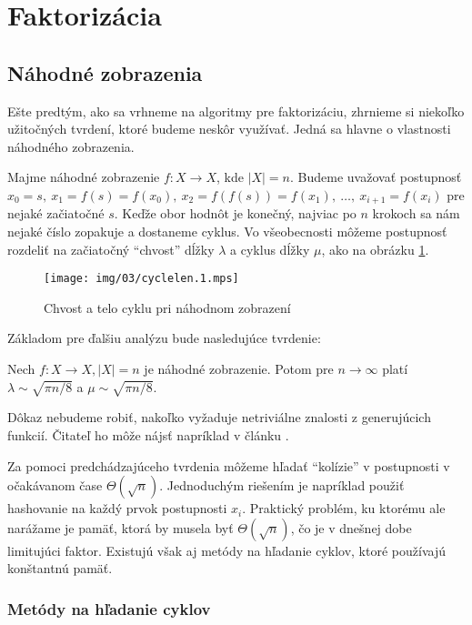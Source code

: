 \section{Faktorizácia}

\subsection{Náhodné zobrazenia}
Ešte predtým, ako sa vrhneme na algoritmy pre faktorizáciu, zhrnieme
si niekoľko užitočných tvrdení, ktoré budeme neskôr využívať. Jedná sa
hlavne o vlastnosti náhodného zobrazenia.

Majme náhodné zobrazenie $f:X \rightarrow X$, kde $|X| = n$.
Budeme uvažovať postupnosť $x_0 = s,\ x_1=f(s)=f(x_0),\ x_2 =
f(f(s))=f(x_1),\ \dots,\ x_{i+1} = f(x_{i})$ pre nejaké začiatočné $s$.
Keďže obor hodnôt je konečný, najviac po $n$ krokoch sa nám nejaké
číslo zopakuje a dostaneme cyklus. Vo všeobecnosti môžeme postupnosť
rozdeliť na začiatočný ``chvost'' dĺžky $\lambda$ a cyklus dĺžky
$\mu$, ako na obrázku \ref{fig:cyclelen}.

\begin{figure}[h!]
    \centering
    \texttt{[image: img/03/cyclelen.1.mps]}
    \caption{Chvost a telo cyklu pri náhodnom zobrazení}
    \label{fig:cyclelen}
\end{figure}

\noindent
Základom pre ďalšiu analýzu bude nasledujúce tvrdenie:

\begin{lema}
    Nech $f:X\rightarrow X, |X|=n$ je náhodné zobrazenie.
    Potom pre $n\rightarrow \infty$ platí
    $\lambda \sim \sqrt{\pi n/8}$ a 
    $\mu \sim \sqrt{\pi n/8}$.
\end{lema}
\begin{dokaz}
    Dôkaz nebudeme robiť, nakoľko vyžaduje netriviálne znalosti
    z generujúcich funkcií. Čitateľ ho môže nájsť napríklad v článku
    \cite{randommap}.
\end{dokaz}

Za pomoci predchádzajúceho tvrdenia môžeme hľadať ``kolízie'' v
postupnosti v očakávanom čase $\Theta(\sqrt{n})$.
Jednoduchým riešením je napríklad použiť hashovanie na každý prvok
postupnosti $x_i$. Praktický problém, ku ktorému ale narážame je
pamäť, ktorá by musela byť $\Theta(\sqrt{n})$, čo je v dnešnej dobe
limitujúci faktor. Existujú však aj metódy na hľadanie cyklov,
ktoré používajú konštantnú pamäť.

\subsubsection{Metódy na hľadanie cyklov}


